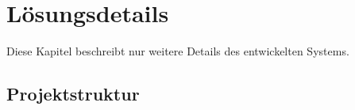 \chapter{Lösungsdetails}
    \label{chapter:SolutionDetails}
    Diese Kapitel beschreibt nur weitere Details des entwickelten Systems.


    
    
    
    
    
    
    
    
    

    \section{Projektstruktur}
